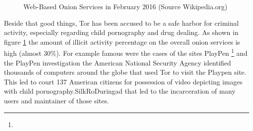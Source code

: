 \documentclass[runningheads,a4paper]{llncs}
\begin{document}
\begin{figure}[]
        \caption{Web-Based Onion Services in February 2016 (Source Wikipedia.org)}
        \label{fig:fig_tor_ill}
\end{figure}

Beside that good things, Tor has been accused to be a safe harbor for criminal activity, especially regarding child pornography and drug dealing. As shown in figure \ref{fig:fig_tor_ill} the amount of illicit activity percentage on the overall onion services is high (almost 30\%). For example famous were the cases of the sites PlayPen
\footnote{}
and  the PlayPen investigation the American National Security Agency identified thousands of computers around the globe that used Tor to visit the Playpen site. This led to court 137 American citizens for possession of video depicting images with child pornography.SilkRoDuringad that led to the incarceration of many users and maintainer of those sites. 
\end{document}
